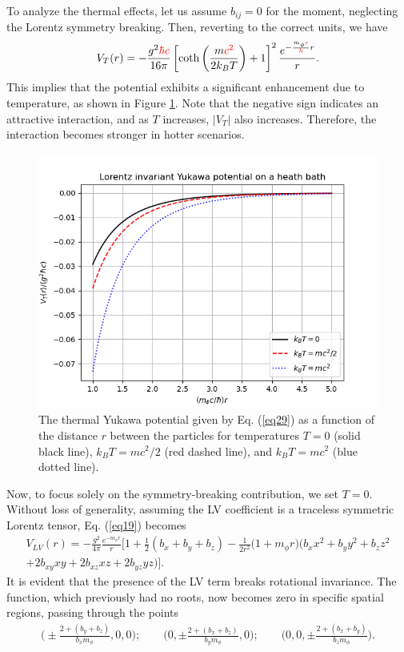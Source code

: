\documentclass[11pt,showpacs,preprintnumbers,amsmath,amssymb,prd,nofootinbib,superscriptaddress]{revtex4-2}
\begin{document}
To analyze the thermal effects, let us assume $b_{ij} = 0$ for the moment, neglecting the Lorentz symmetry breaking. Then, reverting to the correct units, we have
\begin{eqnarray}
    V_T(r)=-\frac{g^2\textcolor{red}{\hbar c} }{16\pi}\left[\coth{\left(\frac{m\textcolor{red}{c^2}}{2k_BT}\right)}+1\right]^2\frac{e^{-\frac{m_{\phi}\textcolor{red}{c}}{\textcolor{red}{\hbar}}r}}{r}.\label{eq29}
\end{eqnarray}
This implies that the potential exhibits a significant enhancement due to temperature, as shown in Figure \ref{fig3}. Note that the negative sign indicates an attractive interaction, and as $T$ increases, $|V_T|$ also increases. Therefore, the interaction becomes stronger in hotter scenarios.
\begin{figure}[ht]
    \centering
\includegraphics[width=0.6\linewidth]{LIThermalPotential.png}
    \caption{The thermal Yukawa potential given by Eq. (\ref{eq29}) as a function of the distance $r$ between the particles for temperatures $T=0$ (solid black line), $k_B T = mc^2 / 2$ (red dashed line), and $k_B T = mc^2$ (blue dotted line).}
    \label{fig3}
\end{figure}

Now, to focus solely on the symmetry-breaking contribution, we set $T=0$. Without loss of generality, assuming the LV coefficient is a traceless symmetric Lorentz tensor, Eq. (\ref{eq19}) becomes
\begin{eqnarray}
    V_{LV}(r)=-\frac{g^2}{4\pi}\frac{e^{-m_{\phi}r}}{r}\biggl[1+\frac{1}{2}(b_{x}+b_{y}+b_{z})-\frac{1}{2r^2}\biggl(1+{m_\phi}r\biggr)\biggl(b_{x}x^2+b_{y}y^2+b_{z}z^2\nonumber\\+2b_{xy}xy+2b_{xz}xz+2b_{yz}yz\biggr)\biggr].
\end{eqnarray}
It is evident that the presence of the LV term breaks rotational invariance. The function, which previously had no roots, now becomes zero in specific spatial regions, passing through the points
\begin{eqnarray}
    \biggl(\pm \frac{2+(b_y+b_z)}{b_x m_\phi},0,0\biggr);\quad\quad \biggl(0,\pm \frac{2+(b_x+b_z)}{b_y m_\phi},0\biggr);\quad\quad \biggl(0,0,\pm \frac{2+(b_x+b_y)}{b_z m_\phi}\biggr).
\end{eqnarray}
\end{document}
